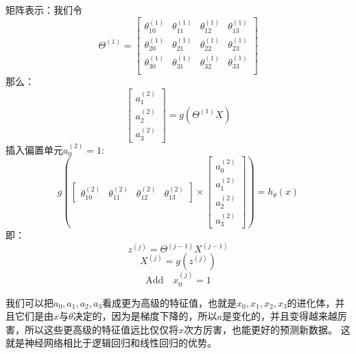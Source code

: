 \documentclass[cn,hazy,blue,normal,14pt]{elegantnote}
\begin{document}
矩阵表示：我们令
$$
\Theta^{(1)}=\begin{bmatrix}
    \theta_{10}^{(1)} &\theta_{11}^{(1)} & \theta_{12}^{(1)} & \theta_{13}^{(1)} \\
    \theta_{20}^{(1)} &\theta_{21}^{(1)} & \theta_{22}^{(1)} & \theta_{23}^{(1)} \\   
    \theta_{30}^{(1)} &\theta_{31}^{(1)} & \theta_{32}^{(1)} & \theta_{33}^{(1)} \\ 
\end{bmatrix}
$$
那么：
$$
\begin{bmatrix}
    a_1^{(2)} \\
    a_2 ^{(2)} \\
    a_3 ^{(2)}
\end{bmatrix}=g(\Theta ^{(1)} X)
$$
插入偏置单元$a_0^{(2)}=1$:
$$
g\left(\begin{bmatrix}
    \theta_{10}^{(2)}&\theta_{11}^{(2)} &\theta_{12}^{(2)} &\theta_{13}^{(2)}
\end{bmatrix}\times \begin{bmatrix}
    a_0 ^{(2)} \\
    a_1^{(2)} \\
    a_2 ^{(2)} \\
    a_3 ^{(2)}    
\end{bmatrix}\right)=h_\theta(x)
$$
即：
$$
z ^{(j)}=\Theta ^{(j-1)}X^{(j-1)} 
$$
$$
X ^{(j)}=g(z^{(j)}) 
$$
$$
\text{Add}\quad  x_0^{(j)}=1
$$
\begin{note}
我们可以把$a_0,a_1,a_2,a_3$看成更为高级的特征值，也就是$x_0,x_1,x_2,x_3$的进化体，并且它们是由$x$与$\theta$决定的，因为是梯度下降的，所以$a$是变化的，并且变得越来越厉害，所以这些更高级的特征值远比仅仅将$x$次方厉害，也能更好的预测新数据。 这就是神经网络相比于逻辑回归和线性回归的优势。
\end{note}
\end{document}
